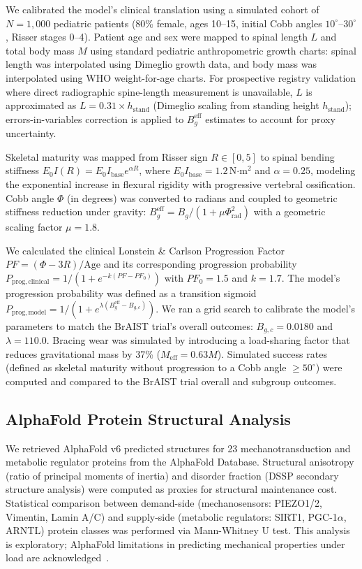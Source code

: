 We calibrated the model's clinical translation using a simulated cohort of $N=1,000$ pediatric patients (80\% female, ages 10--15, initial Cobb angles $10^\circ$--$30^\circ$, Risser stages 0--4). Patient age and sex were mapped to spinal length $L$ and total body mass $M$ using standard pediatric anthropometric growth charts: spinal length was interpolated using Dimeglio growth data, and body mass was interpolated using WHO weight-for-age charts. For prospective registry validation where direct radiographic spine-length measurement is unavailable, $L$ is approximated as $L = 0.31 \times h_{\mathrm{stand}}$ (Dimeglio scaling from standing height $h_{\mathrm{stand}}$); errors-in-variables correction is applied to $B_g^{\mathrm{eff}}$ estimates to account for proxy uncertainty.

Skeletal maturity was mapped from Risser sign $R \in [0, 5]$ to spinal bending stiffness $E_0 I(R) = E_0 I_{\mathrm{base}} e^{\alpha R}$, where $E_0 I_{\mathrm{base}} = 1.2$\,N$\cdot$m$^2$ and $\alpha = 0.25$, modeling the exponential increase in flexural rigidity with progressive vertebral ossification. Cobb angle $\Phi$ (in degrees) was converted to radians and coupled to geometric stiffness reduction under gravity: $B_g^{\mathrm{eff}} = B_g / (1 + \mu \Phi_{\mathrm{rad}}^2)$ with a geometric scaling factor $\mu = 1.8$.

We calculated the clinical Lonstein \& Carlson Progression Factor $PF = (\Phi - 3R)/\mathrm{Age}$ and its corresponding progression probability $P_{\mathrm{prog, clinical}} = 1 / (1 + e^{-k(PF - PF_0)})$ with $PF_0 = 1.5$ and $k=1.7$. The model's progression probability was defined as a transition sigmoid $P_{\mathrm{prog, model}} = 1 / (1 + e^{\lambda (B_g^{\mathrm{eff}} - B_{g,c})})$. We ran a grid search to calibrate the model's parameters to match the BrAIST trial's overall outcomes: $B_{g,c} = 0.0180$ and $\lambda = 110.0$. Bracing wear was simulated by introducing a load-sharing factor that reduces gravitational mass by 37\% ($M_{\mathrm{eff}} = 0.63 M$). Simulated success rates (defined as skeletal maturity without progression to a Cobb angle $\ge 50^\circ$) were computed and compared to the BrAIST trial overall and subgroup outcomes.

\subsection{AlphaFold Protein Structural Analysis}

We retrieved AlphaFold v6 predicted structures for 23 mechanotransduction and metabolic regulator proteins from the AlphaFold Database. Structural anisotropy (ratio of principal moments of inertia) and disorder fraction (DSSP secondary structure analysis) were computed as proxies for structural maintenance cost. Statistical comparison between demand-side (mechanosensors: PIEZO1/2, Vimentin, Lamin A/C) and supply-side (metabolic regulators: SIRT1, PGC-1$\alpha$, ARNTL) protein classes was performed via Mann-Whitney U test. This analysis is exploratory; AlphaFold limitations in predicting mechanical properties under load are acknowledged~\cite{gomes2022protein}.


